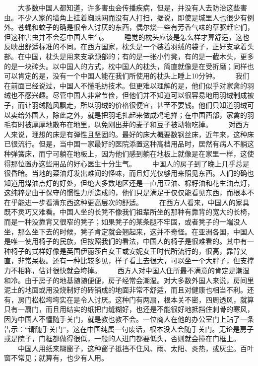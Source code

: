 \documentclass[12pt,oneside]{book}
\begin{document}
\begin{common-format}
　　大多数中国人都知道，许多害虫会传播疾病，但是，并没有人去防治这些害虫。不少人家的墙角上挂着蜘蛛网而没有人打扫，据说，即使是城里人也很少有例外。苍蝇和蚊子的确是很令人讨厌的东西，偶尔烧一些有芳香气味的草驱赶它们，但这种害虫并不会惹中国人生气。 
　　睡觉的枕头应该是怎么样才算舒适，这也反映出舒适标准的不同。在西方国家，枕头是一个装着羽绒的袋子，正好支承着头部。在中国，枕头是用来支承颈部的；有的是一张小竹凳，有的是一截木头，更多的是一块砖头。以中国人的方式，枕中国人的枕头，简直就像是在受折磨；同样也可以肯定的是，没有一个中国人能在我们所使用的枕头上睡上10分钟。 
　　我们在前面已经说过，中国人不懂毛纺技术。但更难以理解的是，他们似乎对家禽的羽绒也不感兴趣。尽管中国人非常节俭，但他们并不知道可以很容易地用羽绒制成被子，而让羽绒随风飘走，所以羽绒的价格很便宜，甚至不要钱。他们只知道羽绒可以卖给外国人，除此之外，就是把羽毛扎起来做成鸡毛掸；在中国西部，家禽的羽毛有时被厚厚地散布在地里，以免刚出芽的麦子和豆子被动物吃掉。 
　　对西方人来说，理想的床是有弹性且坚固的。最好的床大概要数钢丝床，近年来，这种床已很流行。但是，当中国一家最好的医院添置这种高档用品时，居然有病人不躺这种弹簧床，而宁可躺在地板上，因为他们感到躺在地板上就像是在家里一样，这使得那位置办这些用品的好心医生十分生气。 
　　中国人的房子到了晚上几乎总是很昏暗。当地的菜油灯发出难闻的怪味，而且灯光仅够用来照见东西。人们的确也知道用煤油点灯的好处，但绝大多数地区还是一直用豆油、棉籽油和花生油点灯，这纯粹是由于保守的惯性力所造成的，他们只是满足于仅仅能看见东西，而根本不在乎能进一步看清东西这种更高层次的舒适。 
　　在西方人看来，中国人的家具既不灵巧又难看。中国人坐的长凳不像我们祖辈所坐的那种有靠背的宽大的长椅，而是一种没靠背又很窄的凳子；如果凳子的某条腿不牢固，或者凳子的一端没人坐，那么坐下去的时候，凳子肯定就会翘起来，这并不奇怪。在亚洲各国，中国人是唯一使用椅子的民族，但按照我们的看法，中国人的椅子是很难看的。其中有一种椅子的式样好像是英国伊丽莎白女王或安妮女王时代所流行的，很高，靠背又直，非常呆板。还有一种比较多见，样子看上去很大，可以坐一个大胖子，但支撑力不相称，估计很快就会垮掉。 
　　西方人对中国人住所最不满意的肯定是潮湿和冷。由于房子的地基随随便便，房子经常会潮湿。对大多数外国人来说，房间里泥土的地面或用没烧制好的砖铺成的地面非常不舒适，而且对健康也相当不利。还有，房门松松垮垮实在是令人讨厌。这种门有两扇，根本关不密，四周透风，就算只有一扇门，而且用结实的纸把门缝糊好，也还是不能很好地抵挡住刺骨的寒风，因为中国人不懂随手关门，就是教也教不会。一位商人在他的办公室门上贴了一条告示：“请随手关门”，这在中国纯属一句废话，根本没人会随手关门。无论是房子或是院子，门框都做得很低，一般的人进门都要低头，否则就会撞在门框上。 
　　中国人用纸来糊窗子，这种窗子抵挡不住风、雨、太阳、炎热，或灰尘。百叶窗不常见；就算有，也少有人用。 

\end{common-format}
\end{document}
